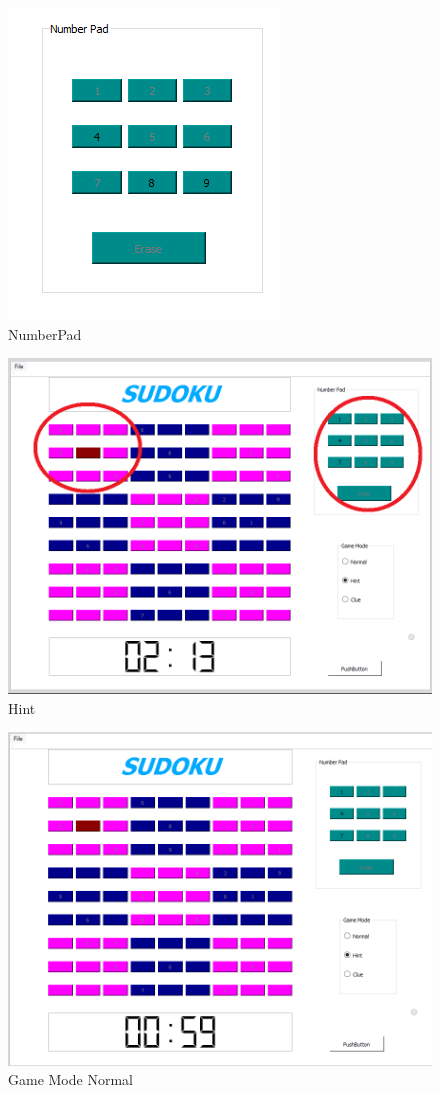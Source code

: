 \documentclass[12pt,oneside]{book}
\begin{document}
\begin{figure}[htbp]
\begin{center}
\includegraphics[width=.60\textwidth]{./imagenes/NumberPad.png}
\caption{NumberPad}
\label{NumberPad}
\end{center}
\end{figure}

\begin{figure}
\begin{center}
\includegraphics[width=.60\textwidth]{./imagenes/pantalla4.png}
\caption{Hint}
\label{Hint}
\end{center}
\end{figure}

\begin{figure}
\begin{center}
\includegraphics[width=.60\textwidth]{./imagenes/pantalla3.png}
\caption{Game Mode Normal}
\label{Game Mode Normal}
\end{center}
\end{figure}
\end{document}
